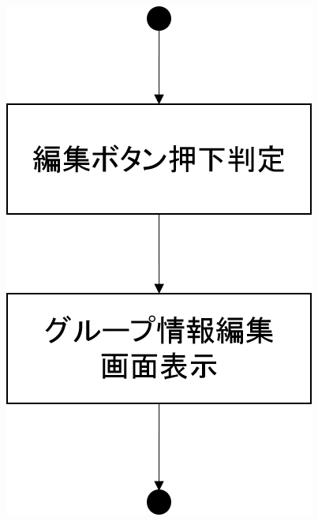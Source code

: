 \begin{figure}[htbp]
 \begin{minipage}{0.5\hsize}
  \begin{center}
   \includegraphics[width=0.45\linewidth,clip]{./img/edit_group/sub3.png}
  \end{center}
 \end{minipage}
 \begin{minipage}{0.5\hsize}
  \begin{center}

\end{center}
\end{minipage}
\end{figure}
